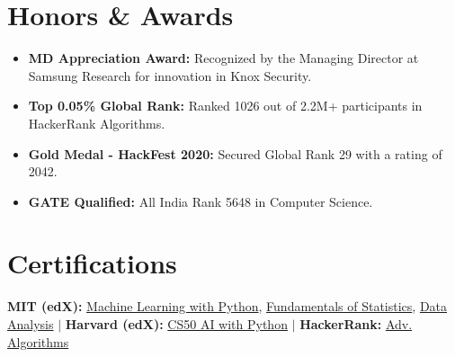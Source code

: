 \documentclass[10pt, letterpaper]{article}
\newcommand{\resumeItem}[1]{
  \item\small{
    {#1 \vspace{-2pt}}
  }
}
\newcommand{\resumeSubHeadingListStart}{\begin{itemize}[leftmargin=0.15in, label={}]}
\newcommand{\resumeSubHeadingListEnd}{\end{itemize}}
\begin{document}
\section{Honors \& Awards}
  \resumeSubHeadingListStart
    \resumeItem{\textbf{MD Appreciation Award:} Recognized by the Managing Director at Samsung Research for innovation in Knox Security.}
    \resumeItem{\textbf{Top 0.05\% Global Rank:} Ranked 1026 out of 2.2M+ participants in HackerRank Algorithms.}
    \resumeItem{\textbf{Gold Medal - HackFest 2020:} Secured Global Rank 29 with a rating of 2042.}
    \resumeItem{\textbf{GATE Qualified:} All India Rank 5648 in Computer Science.}
  \resumeSubHeadingListEnd

\section{Certifications}
  \small{
    \textbf{MIT (edX):} \href{https://courses.edx.org/certificates/bf4ea7cb34a742cea00c770801d1947d}{Machine Learning with Python}, \href{https://courses.edx.org/certificates/3c59035943454549990f2d2de7f49e9f}{Fundamentals of Statistics}, \href{https://courses.edx.org/certificates/bf4ea7cb34a742cea00c770801d1947d}{Data Analysis} $|$
    \textbf{Harvard (edX):} \href{https://cs50.harvard.edu/certificates/2b1773c1-473d-4a7b-89ae-460d23154126}{CS50 AI with Python} $|$
    \textbf{HackerRank:} \href{https://www.hackerrank.com/certificates/fc7b9af8aac8}{Adv. Algorithms}
  }

\end{document}
